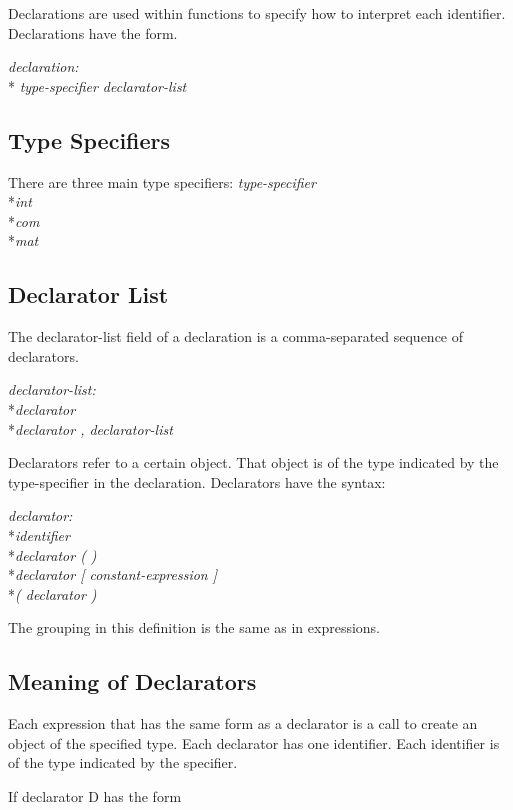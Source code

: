 Declarations are used within functions to specify how to interpret each identifier. Declarations have the form.

	\textit{ declaration: }
		\\*\indent\indent\textit{ type-specifier declarator-list}

\subsection{Type Specifiers}

There are three main type specifiers:
	\textit{type-specifier}
		\\*\indent\indent\textit{int}
		\\*\indent\indent\textit{com}
		\\*\indent\indent\textit{mat}

\subsection{ Declarator List }
The declarator-list field of a declaration is a comma-separated sequence of declarators.

	\textit{declarator-list:}
		\\*\indent\indent\textit{declarator}
		\\*\indent\indent\textit{declarator , declarator-list}

Declarators refer to a certain object. That object is of the type indicated by the type-specifier in the declaration. Declarators have the syntax:

	\textit{declarator:}
		\\*\indent\indent\textit{identifier}
		\\*\indent\indent\textit{declarator ( )}
		\\*\indent\indent\textit{declarator [ constant-expression ]}
		\\*\indent\indent\textit{( declarator )}

The grouping in this definition is the same as in expressions.				

\subsection{ Meaning of Declarators }
Each expression that has the same form as a declarator is a call to create an object of the specified type. Each declarator has one identifier. Each identifier is of the type indicated by the specifier.

If declarator D has the form

